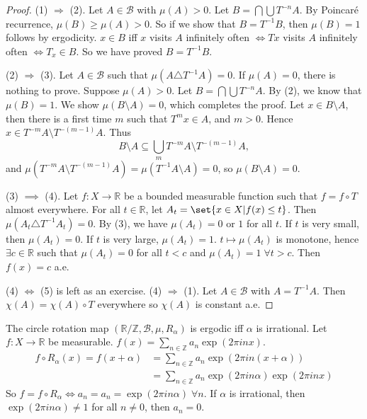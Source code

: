 \documentclass{article}
\begin{document}
\begin{proof}
  (1) $\Rightarrow$ (2). Let $A \in \mathcal{B}$ with $\mu(A) > 0$. Let $B = \bigcap \bigcup T^{-n}A$.
  By Poincar\'e recurrence, $\mu(B) \geq \mu(A) > 0$. So if we show that $B = T^{-1} B$, then $\mu(B) = 1$ follows by ergodicity.
  $x \in B$ iff $x$ visits $A$ infinitely often $\iff Tx$ visits $A$ infinitely often $\iff T_x \in B$.
  So we have proved $B = T^{-1} B$.

  (2) $\Rightarrow$ (3). Let $A \in \mathcal{B}$ such that $\mu(A \triangle T^{-1} A) = 0$. If $\mu(A) = 0$, there is nothing to prove. Suppose $\mu(A) > 0$.
  Let $B = \bigcap \bigcup T^{-n} A$. By (2), we know that $\mu(B) = 1$. We show $\mu(B \setminus A) = 0$, which completes the proof.
  Let $x \in B \setminus A$, then there is a first time $m$ such that $T^m x \in A$, and $m > 0$.
  Hence $x \in T^{-m} A \setminus T^{-(m-1)}A$. Thus
  \begin{equation*}
    B \setminus A \subseteq \bigcup_m T^{-m} A \setminus T^{-(m-1)} A,
  \end{equation*}
  and $\mu(T^{-m} A \setminus T^{-(m-1)} A) = \mu(T^{-1} A \setminus A) = 0$, so $\mu(B \setminus A) = 0$.

  (3) $\implies$ (4).
  Let $f : X \to \mathbb{R}$ be a bounded measurable function such that $f = f \circ T$ almost everywhere.
  For all $t \in \mathbb{R}$, let $A_t = \set{x \in X | f(x) \leq t}$.
  Then $\mu(A_t \triangle T^{-1} A_t) = 0$.
  By (3), we have $\mu(A_t) = 0$ or $1$ for all $t$.
  If $t$ is very small, then $\mu(A_t) = 0$. If $t$ is very large, $\mu(A_t) = 1$. $t \mapsto \mu(A_t)$ is monotone, hence $\exists c \in \mathbb{R}$ such that $\mu(A_t) = 0$ for all $t < c$ and $\mu(A_t) = 1 \; \forall t > c$.
  Then $f(x) = c$ a.e.

  (4) $\Leftrightarrow$ (5) is left as an exercise.
  (4) $\Rightarrow$ (1). Let $A \in \mathcal{B}$ with $A = T^{-1} A$. Then $\chi(A) = \chi(A) \circ T$ everywhere so $\chi(A)$ is constant a.e.
\end{proof}
\begin{eg}
  The circle rotation map $(\mathbb{R}/\mathbb{Z}, \mathcal{B}, \mu, R_\alpha)$ is ergodic iff $\alpha$ is irrational.
  Let $f: X \to \mathbb{R}$ be measurable. $f(x) = \sum_{n \in \mathbb{Z}} a_n \exp(2\pi i n x)$.
  \begin{align}
    f \circ R_\alpha(x) = f(x + \alpha) &= \sum_{n \in \mathbb{Z}} a_n \exp(2 \pi i n (x + \alpha)) \\
                                        &= \sum_{n \in \mathbb{Z}} a_n \exp(2\pi i n \alpha) \exp(2 \pi i n x)
  \end{align}
  So $f = f \circ R_\alpha \iff a_n = a_n = \exp(2 \pi i n \alpha) \; \forall n$. If $\alpha$ is irrational, then $\exp(2 \pi i n \alpha) \neq 1$ for all $n \neq 0$, then $a_n = 0$.
\end{eg}
\end{document}
